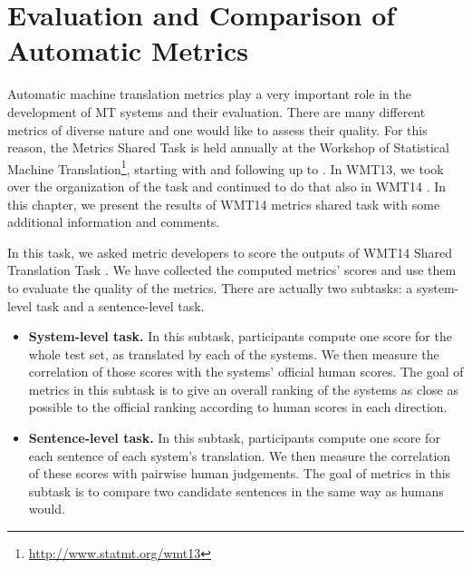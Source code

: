 \chapter{Evaluation and Comparison of Automatic Metrics}
\label{metrics}

%
%

Automatic machine translation metrics play a very important role in the
development of MT systems and their evaluation. There are many different
metrics of diverse nature and one would like to assess their quality. For this
reason, the Metrics Shared Task is held annually at the Workshop of Statistical
Machine Translation\footnote{\url{http://www.statmt.org/wmt13}}, starting with
 and following up to
. In WMT13, we took over the organization of the
task  and continued to do that also in WMT14
. In this chapter, we present the results of WMT14
metrics shared task with some additional information and comments.

In this task, we asked metric developers to score the outputs of WMT14 Shared
Translation Task . We have collected the computed
metrics' scores and use them to evaluate the quality of the metrics.  There are
actually two subtasks: a system-level task and a sentence-level task.

\begin{itemize}

    \item \textbf{System-level task.} In this subtask, participants compute one
      score for the whole test set, as translated by each of the systems. We
      then measure the correlation of those scores with the systems' official
      human scores.  The goal of metrics in this subtask is to give an overall
      ranking of the systems as close as possible to the official ranking
      according to human scores in each direction.
    
    \item \textbf{Sentence-level task.} In this subtask, participants compute
      one score for each sentence of each system's translation. We then measure
      the correlation of these scores with pairwise human judgements. The goal
      of metrics in this subtask is to compare two candidate sentences in the
      same way as humans would.

\end{itemize}

